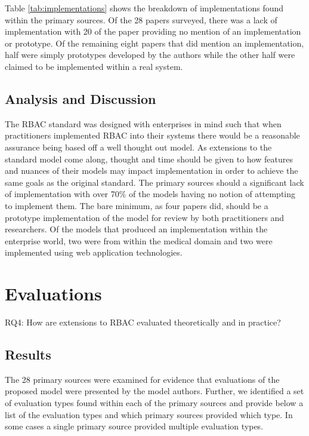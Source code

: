 Table \ref{tab:implementations} shows the breakdown of implementations found within the primary sources.
Of the 28 papers surveyed, there was a lack of implementation with 20 of the paper providing no
mention of an implementation or prototype.  Of the remaining eight papers that did mention an implementation, half 
were simply prototypes developed by the authors while the other half were claimed to be implemented within a real
system.

\subsection{Analysis and Discussion}

The RBAC standard was designed with enterprises in mind such that when practitioners implemented RBAC into their systems
there would be a reasonable assurance being based off a well thought out model.  As extensions to the standard model
come along, thought and time should be given to how features and nuances of their models may impact implementation
in order to achieve the same goals as the original standard.  The primary sources should a significant lack of implementation
with over 70\% of the models having no notion of attempting to implement them.  The bare minimum, as four papers did, should be
a prototype implementation of the model for review by both practitioners and researchers. Of the models that produced an 
implementation within the enterprise world, two were from within the medical domain and two were implemented using web application technologies.  

\section{Evaluations} \label{sec:evaluations}

RQ4: How are extensions to RBAC evaluated theoretically and in practice?

\subsection{Results}

The 28 primary sources were examined for evidence that evaluations of the proposed model were presented by the model authors.
Further, we identified a set of evaluation types found within  each of the primary sources and provide below a list of the 
evaluation types and which primary sources provided which type.  In some cases a single primary source provided multiple evaluation
types.

